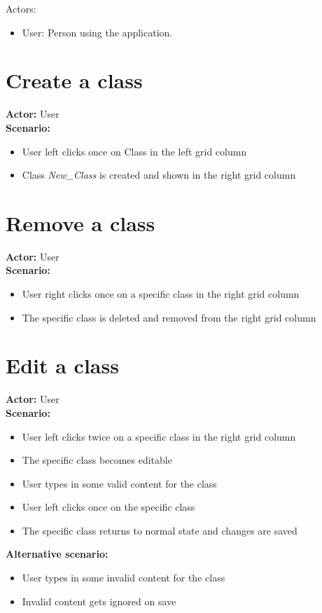 Actors:
\begin{itemize}
\item User: Person using the application.
\end{itemize}

\section{Create a class}
\textbf{Actor:} User\\
\textbf{Scenario:}
\begin{itemize}
\item User left clicks once on Class in the left grid column
\item Class \textit{New\_Class} is created and shown in the right grid column
\end{itemize}

\section{Remove a class}
\textbf{Actor:} User\\
\textbf{Scenario:}
\begin{itemize}
\item User right clicks once on a specific class in the right grid column
\item The specific class is deleted and removed from the right grid column
\end{itemize}

\section{Edit a class}
\textbf{Actor:} User\\
\textbf{Scenario:}
\begin{itemize}
\item User left clicks twice on a specific class in the right grid column
\item The specific class becomes editable
\item User types in some valid content for the class
\item User left clicks once on the specific class
\item The specific class returns to normal state and changes are saved
\end{itemize}
\textbf{Alternative scenario:} 
\begin{itemize}
\item User types in some invalid content for the class
\item Invalid content gets ignored on save
\end{itemize}

